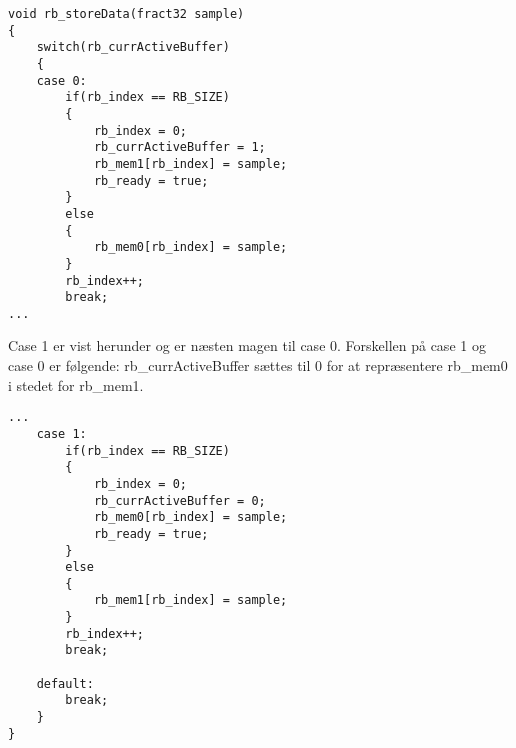 \begin{verbatim}
void rb_storeData(fract32 sample)
{
    switch(rb_currActiveBuffer)
    {
    case 0:
        if(rb_index == RB_SIZE)
        {
            rb_index = 0;
            rb_currActiveBuffer = 1;
            rb_mem1[rb_index] = sample;
            rb_ready = true;
        }
        else
        {
            rb_mem0[rb_index] = sample;
        }
        rb_index++;
        break;
...
\end{verbatim}

Case 1 er vist herunder og er næsten magen til case 0. Forskellen på case 1 og case 0 er følgende: 
rb\_currActiveBuffer sættes til 0 for at repræsentere rb\_mem0 i stedet for rb\_mem1. 

\begin{verbatim}
...
    case 1:
        if(rb_index == RB_SIZE)
        {
            rb_index = 0;
            rb_currActiveBuffer = 0;
            rb_mem0[rb_index] = sample;
            rb_ready = true;
        }
        else
        {
            rb_mem1[rb_index] = sample;
        }
        rb_index++;
        break;

    default:
        break;
    }
}\end{verbatim}






